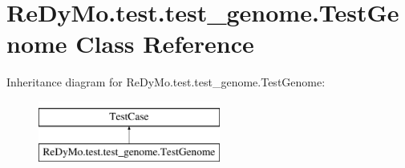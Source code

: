 \hypertarget{classReDyMo_1_1test_1_1test__genome_1_1TestGenome}{}\section{Re\+Dy\+Mo.\+test.\+test\+\_\+genome.\+Test\+Genome Class Reference}
\label{classReDyMo_1_1test_1_1test__genome_1_1TestGenome}
Inheritance diagram for Re\+Dy\+Mo.\+test.\+test\+\_\+genome.\+Test\+Genome\+:\begin{figure}[H]
\begin{center}
\leavevmode
\includegraphics[height=2.000000cm]{classReDyMo_1_1test_1_1test__genome_1_1TestGenome}
\end{center}
\end{figure}
